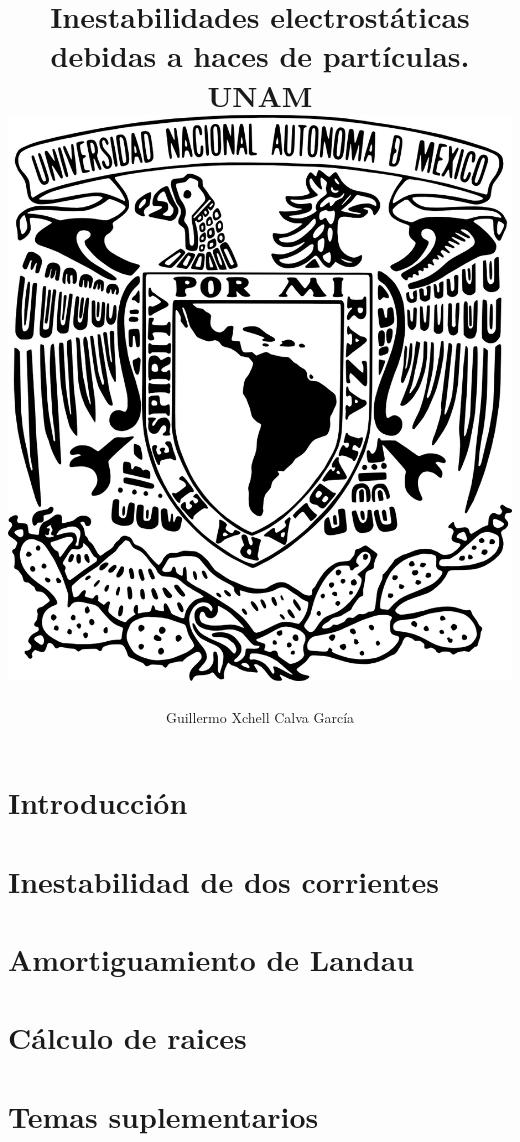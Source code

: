 \documentclass[12pt,letterpaper]{report}
\title{
	{Inestabilidades electrostáticas debidas a haces de partículas.}\\
	{\large UNAM}\\
	{\includegraphics{Escudo-UNAM-transparente.png}}
}
\author{Guillermo Xchell Calva García}
\date{}
\newcommand{\onlyinsubfile}[1]{#1}
\newcommand{\notinsubfile}[1]{}
\begin{document}
\renewcommand{\onlyinsubfile}[1]{}
\renewcommand{\notinsubfile}[1]{#1}
\maketitle
%
%
%

\tableofcontents
\listoffigures
{}
\selectfont
\chapter{Introducción}

\label{Ch1:Intro}
\chapter{Inestabilidad de dos corrientes}
\label{Ch2:inestabilidades}
\chapter{Amortiguamiento de Landau}\label{Ch3:Landau}


\appendix
\chapter{Cálculo de raices}
\label{Ap:raices}
\chapter{Temas suplementarios}
\label{Ap:transformadas}

\cleardoublepage{}
{}


\end{document}
